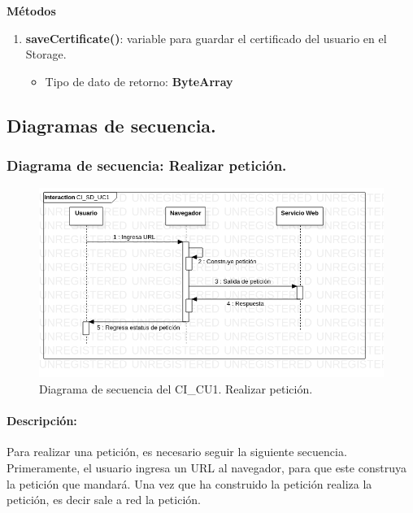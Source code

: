 \documentclass[12pt, a4paper, titlepage]{report}
\begin{document}
    		        \textbf{Métodos}
    		        \begin{enumerate}
    		            \item \textbf{saveCertificate()}: variable para guardar el certificado del usuario en el Storage.
    		            \begin{itemize}
    		                \item Tipo de dato de retorno: \textbf{ByteArray}
    		            \end{itemize}
    		        \end{enumerate}
			   
			   
			   
			   

            \subsection{Diagramas de secuencia.}       
          	
              	\subsubsection{Diagrama de secuencia: Realizar petición.}
                	\begin{figure}[H]
        			    \begin{center} \includegraphics[width=14cm]{./imagenes/Disenio/Componente_1/CI_SD_UC1.png}
        			    \caption[Diagrama de secuencia 1 del Componente I]{Diagrama de secuencia del CI\_CU1. Realizar petición.}
        		        \end{center}
        		    \end{figure}
        		    
        		    \paragraph{Descripción:}
        		    Para realizar una petición, es necesario seguir la siguiente secuencia. Primeramente, el usuario ingresa un URL al navegador, para que este construya la petición que mandará. Una vez que ha construido la petición realiza la petición, es decir sale a red la petición.
    		    
\end{document}
